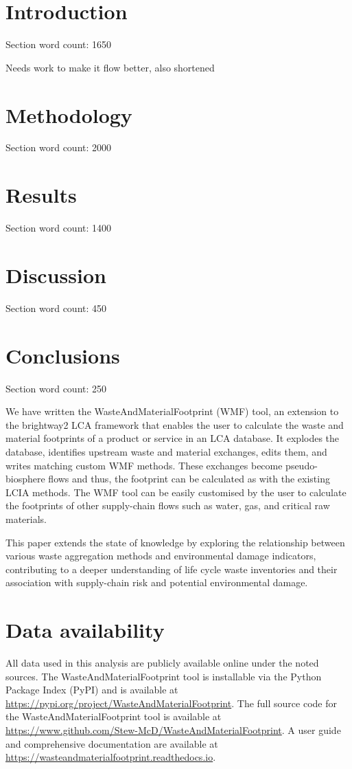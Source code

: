 \documentclass[final,5p,authoryear]{elsarticle}
\newcommand{\cbox}[1]{
    \begin{tcolorbox}[hbox, colback=red!5!white, colframe=red!65!black, boxrule=0.25pt, boxsep=2pt, left=2pt, right=2pt, top=1pt, bottom=1pt]
        \small\sffamily #1
    \end{tcolorbox}
}
\begin{document}
\section{Introduction}
\label{sec:introduction}
\cbox{Section word count: 1650}
\cbox{Needs work to make it flow better, also shortened}


\section{Methodology}
\label{sec:methodology}
\cbox{Section word count: 2000}


\section{Results}
\cbox{Section word count: 1400}
\label{sec:results}


\section{Discussion}
\label{sec:discussion}

\cbox{Section word count: 450}

\section{Conclusions}
\label{sec:conclusions}
\cbox{Section word count: 250}
We have written the WasteAndMaterialFootprint (WMF) tool, an extension to the brightway2 LCA framework that enables the user to calculate the waste and material footprints of a product or service in an LCA database. It explodes the database, identifies upstream waste and material exchanges, edits them, and writes matching custom WMF methods. These exchanges become pseudo-biosphere flows and thus, the footprint can be calculated as with the existing LCIA methods. The WMF tool can be easily customised by the user to calculate the footprints of other supply-chain flows such as water, gas, and critical raw materials.

This paper extends the state of knowledge by exploring the relationship between various waste aggregation methods and environmental damage indicators, contributing to a deeper understanding of life cycle waste inventories and their association with supply-chain risk and potential environmental damage.


\section*{Data availability} 
All data used in this analysis are publicly available online under the noted sources. The WasteAndMaterialFootprint tool is installable via the Python Package Index (PyPI) and is available at \url{https://pypi.org/project/WasteAndMaterialFootprint}.
The full source code for the WasteAndMaterialFootprint tool is available at \url{https://www.github.com/Stew-McD/WasteAndMaterialFootprint}.
A user guide and comprehensive documentation are available at \url{https://wasteandmaterialfootprint.readthedocs.io}.
\end{document}
